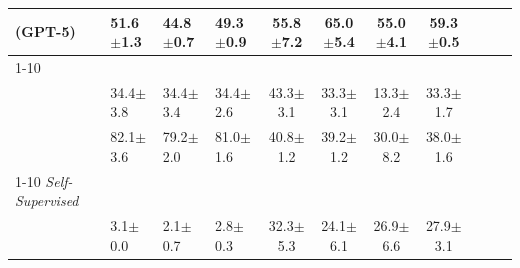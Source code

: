 \begin{table}[t!]
{\begin{tabular}{l l l l ccc cccc}
    \react{}(GPT-5)
    & 51.6\tiny{$\pm$1.3} & 44.8\tiny{$\pm$0.7} & 49.3\tiny{$\pm$0.9}
    & 55.8\tiny{$\pm$7.2} & 65.0\tiny{$\pm$5.4} & 55.0\tiny{$\pm$4.1} & 59.3\tiny{$\pm$0.5}\\

    
    
    

    \cmidrule(lr){1-10}
    \multicolumn{5}{l}{\emph{Learning from task success reward}}\\
    \rft{}
    & 34.4\tiny{$\pm$3.8} & 34.4\tiny{$\pm$3.4} & 34.4\tiny{$\pm$2.6}
    & 43.3\tiny{$\pm$3.1} & 33.3\tiny{$\pm$3.1} & 13.3\tiny{$\pm$2.4} & 33.3\tiny{$\pm$1.7}\\

    \policyrl{}
    & 82.1\tiny{$\pm$3.6} & 79.2\tiny{$\pm$2.0} & 81.0\tiny{$\pm$1.6}
    & 40.8\tiny{$\pm$1.2} & 39.2\tiny{$\pm$1.2} & 30.0\tiny{$\pm$8.2} & 38.0\tiny{$\pm$1.6}\\

    \cmidrule(lr){1-10}
    \emph{Self-Supervised} \\
    \wmsftshort{}
    & 3.1\tiny{$\pm$0.0} & 2.1\tiny{$\pm$0.7} & 2.8\tiny{$\pm$0.3}
    & 32.3\tiny{$\pm$5.3} & 24.1\tiny{$\pm$6.1} & 26.9\tiny{$\pm$6.6} & 27.9\tiny{$\pm$3.1} \\
    

\end{tabular}}
\end{table}
